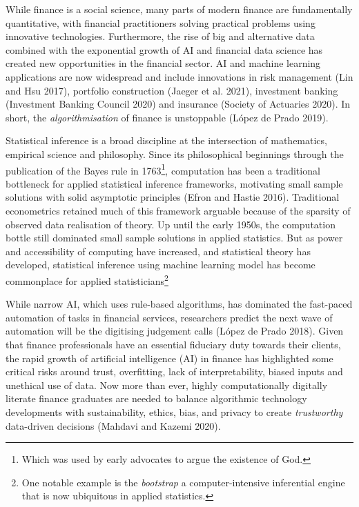 \documentclass{article}
\begin{document}
While finance is a social science, many parts of modern finance are
fundamentally quantitative, with financial practitioners solving
practical problems using innovative technologies. Furthermore, the rise
of big and alternative data combined with the exponential growth of AI
and financial data science has created new opportunities in the
financial sector. AI and machine learning applications are now
widespread and include innovations in risk management (Lin and Hsu
2017), portfolio construction (Jaeger et al. 2021), investment banking
(Investment Banking Council 2020) and insurance (Society of Actuaries
2020). In short, the \emph{algorithmisation} of finance is unstoppable
(López de Prado 2019).

Statistical inference is a broad discipline at the intersection of
mathematics, empirical science and philosophy. Since its philosophical
beginnings through the publication of the Bayes rule in 1763\footnote{Which
  was used by early advocates to argue the existence of God.},
computation has been a traditional bottleneck for applied statistical
inference frameworks, motivating small sample solutions with solid
asymptotic principles (Efron and Hastie 2016). Traditional econometrics
retained much of this framework arguable because of the sparsity of
observed data realisation of theory. Up until the early 1950s, the
computation bottle still dominated small sample solutions in applied
statistics. But as power and accessibility of computing have increased,
and statistical theory has developed, statistical inference using
machine learning model has become commonplace for applied
statisticians\footnote{One notable example is the \emph{bootstrap} a
  computer-intensive inferential engine that is now ubiquitous in
  applied statistics.}

While narrow AI, which uses rule-based algorithms, has dominated the
fast-paced automation of tasks in financial services, researchers
predict the next wave of automation will be the digitising judgement
calls (López de Prado 2018). Given that finance professionals have an
essential fiduciary duty towards their clients, the rapid growth of
artificial intelligence (AI) in finance has highlighted some critical
risks around trust, overfitting, lack of interpretability, biased inputs
and unethical use of data. Now more than ever, highly computationally
digitally literate finance graduates are needed to balance algorithmic
technology developments with sustainability, ethics, bias, and privacy
to create \emph{trustworthy} data-driven decisions (Mahdavi and Kazemi
2020).
\end{document}
